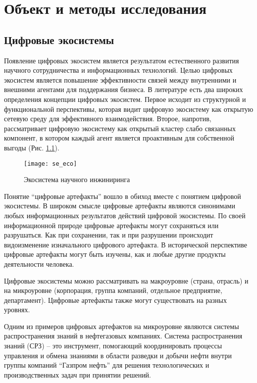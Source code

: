 \chapter[Объект и метод]{Объект и методы исследования}
\label{cha:objectandmethod}

\section{Цифровые экосистемы}
Появление цифровых экосистем является результатом естественного развития научного сотрудничества и информационных технологий. 
Целью цифровых экосистем является повышение эффективности связей между внутренними и внешними агентами для поддержания бизнеса. 
В литературе есть два широких определения концепции цифровых экосистем. 
Первое исходит из структурной и функциональной перспективы, которая видит цифровую экосистему как открытую сетевую среду для эффективного взаимодействия. Второе, напротив, рассматривает цифровую экосистему как открытый кластер слабо связанных компонент, в котором каждый агент является проактивным для собственной выгоды (Рис. \ref{fig:om0}).

\begin{figure}[H]
  \label{fig:om0}
  \centering
  \texttt{[image: se\_eco]}
  \caption{Экосистема научного инжиниринга}
\end{figure}

Понятие ``цифровые артефакты'' вошло в обиход вместе с понятием цифровой экосистемы. 
В широком смысле цифровые артефакты являются синонимами любых информационных результатов действий цифровой экосистемы. 
По своей информационной природе цифровые артефакты могут сохраняться или разрушаться.
Как при сохранении, так и при разрушении происходит видоизменение изначального цифрового артефакта. 
В исторической перспективе цифровые артефакты могут быть изучены, как и любые другие продукты деятельности человека.

Цифровые экосистемы можно рассматривать на макроуровне (страна, отрасль) и на микроуровне (корпорация, группа компаний, отдельное предприятие, департамент). Цифровые артефакты также могут существовать на разных уровнях. 

Одним из примеров цифровых артефактов на микроуровне являются системы распространения знаний в нефтегазовых компаниях.
Система распространения знаний (СРЗ) – это инструмент, помогающий координировать процессы управления и обмена знаниями в области разведки и добычи нефти внутри группы компаний ``Газпром нефть'' для решения технологических и производственных задач при принятии решений. 

